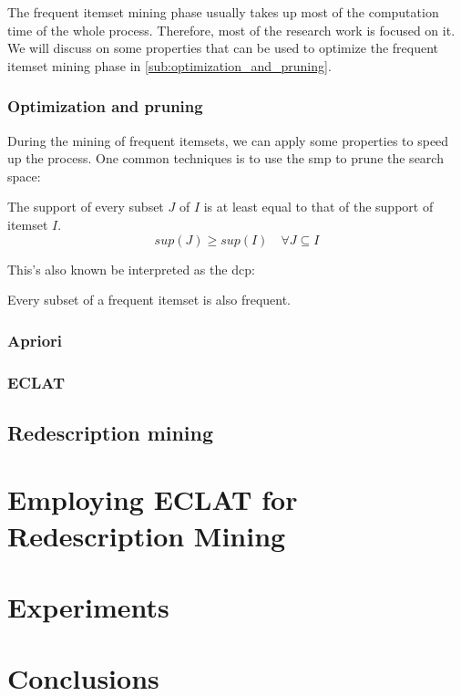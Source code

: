 The frequent itemset mining phase usually takes up most of the computation time of the whole process.
Therefore, most of the research work is focused on it.
We will discuss on some properties that can be used to optimize the frequent itemset mining phase in \autoref{sub:optimization_and_pruning}.
\subsection{Optimization and pruning}
\label{sub:optimization_and_pruning}
During the mining of frequent itemsets, we can apply some properties to speed up the process.
One common techniques is to use the \acl{smp} to prune the search space:
\begin{definition}
    The support of every subset $J$ of $I$ is at least equal to that of the support of itemset $I$.
    \begin{equation}
        sup(J) \geq sup(I) \quad \forall J \subseteq I
    \end{equation}
\end{definition}
This's also known be interpreted as the \acl{dcp}:
\begin{definition}
    Every subset of a frequent itemset is also frequent.
\end{definition}

\subsection{Apriori}
\subsection{ECLAT}

\section{Redescription mining}


\chapter{Employing ECLAT for Redescription Mining}
\label{cha:employment}

\chapter{Experiments}
\label{cha:experiments}

\chapter{Conclusions}
\label{cha:conclusions}